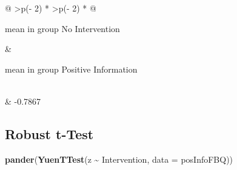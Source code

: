 \documentclass[
]{article}
\newenvironment{Shaded}{\begin{snugshade}}{\end{snugshade}}
\newcommand{\AttributeTok}[1]{\textcolor[rgb]{0.13,0.29,0.53}{#1}}
\newcommand{\FunctionTok}[1]{\textcolor[rgb]{0.13,0.29,0.53}{\textbf{#1}}}
\newcommand{\NormalTok}[1]{#1}
\newcommand{\SpecialCharTok}[1]{\textcolor[rgb]{0.81,0.36,0.00}{\textbf{#1}}}
\begin{document}
\begin{longtable}[]{@{}
  >{\centering\arraybackslash}p{(\columnwidth - 2\tabcolsep) * }
  >{\centering\arraybackslash}p{(\columnwidth - 2\tabcolsep) * }@{}}
\toprule\noalign{}
\begin{minipage}[b]{\linewidth}\centering
mean in group No Intervention
\end{minipage} & \begin{minipage}[b]{\linewidth}\centering
mean in group Positive
Information
\end{minipage} \\
\midrule\noalign{}
\endhead
\bottomrule\noalign{}
 & -0.7867 \\
\end{longtable}

\subsection*{Robust t-Test}\label{robust-t-test}

\begin{Shaded}
\begin{Highlighting}[]
    \FunctionTok{pander}\NormalTok{(}\FunctionTok{YuenTTest}\NormalTok{(z }\SpecialCharTok{\textasciitilde{}}\NormalTok{ Intervention, }\AttributeTok{data =}\NormalTok{ posInfoFBQ))}
\end{Highlighting}
\end{Shaded}
\end{document}
